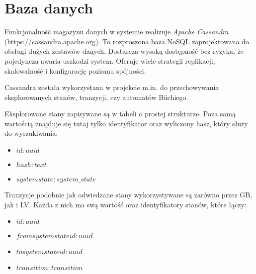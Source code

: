 \section{Baza danych}

Funkcjonalność magazynu danych w systemie realizuje \textit{Apache Cassandra} (\url{https://cassandra.apache.org}).
To rozproszona baza NoSQL zaprojektowana do obsługi dużych zestawów danych.
Dostarcza wysoką dostępność bez ryzyka, że pojedyncza awaria uszkodzi system.
Oferuje wiele strategii replikacji, skalowalność i konfigurację poziomu spójności.

Cassandra została wykorzystana w projekcie m.in. do przechowywania eksplorowanych stanów, tranzycji, czy automatów Büchiego.

\noindent
Eksplorowane stany zapisywane są w tabeli o prostej strukturze.
Poza samą wartością znajduje się tutaj tylko identyfikator oraz wyliczony hasz, który służy do wyszukiwania:
\begin{itemize}
    \setlength\itemsep{-0.1cm}
    \item $ id: uuid $
    \item $ hash: text $
    \item $ systemstate: system\_state $
\end{itemize}
Tranzycje podobnie jak odwiedzane stany wykorzystywane są zarówno przez GB, jak i LV.
Każda z nich ma swą wartość oraz identyfikatory stanów, które łączy:
\begin{itemize}
    \setlength\itemsep{-0.1cm}
    \item $ id: uuid $
    \item $ fromsystemstateid: uuid $
    \item $ tosystemstateid: uuid $
    \item $ transition: transition $
\end{itemize}

